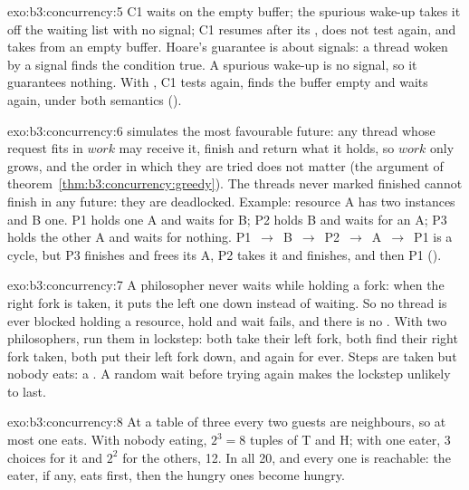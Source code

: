\begin{solution}{exo:b3:concurrency:5}
C1 waits on the empty buffer; the spurious wake-up takes it off the waiting list with no signal; C1 resumes after its , does not test again, and takes from an empty buffer. Hoare's guarantee is about signals: a thread woken by a signal finds the condition true. A spurious wake-up is no signal, so it guarantees nothing. With , C1 tests again, finds the buffer empty and waits again, under both semantics ().
\end{solution}

\begin{solution}{exo:b3:concurrency:6}
 simulates the most favourable future: any thread whose request fits in $\mathit{work}$ may receive it, finish and return what it holds, so $\mathit{work}$ only grows, and the order in which they are tried does not matter (the argument of theorem~\ref{thm:b3:concurrency:greedy}). The threads never marked finished cannot finish in any future: they are deadlocked. Example: resource A has two instances and B one. P1 holds one A and waits for B; P2 holds B and waits for an A; P3 holds the other A and waits for nothing. P1~$\to$~B~$\to$~P2~$\to$~A~$\to$~P1 is a cycle, but P3 finishes and frees its A, P2 takes it and finishes, and then P1 ().
\end{solution}

\begin{solution}{exo:b3:concurrency:7}
A philosopher never waits while holding a fork: when the right fork is taken, it puts the left one down instead of waiting. So no thread is ever blocked holding a resource, hold and wait fails, and there is no . With two philosophers, run them in lockstep: both take their left fork, both find their right fork taken, both put their left fork down, and again for ever. Steps are taken but nobody eats: a . A random wait before trying again makes the lockstep unlikely to last.
\end{solution}

\begin{solution}{exo:b3:concurrency:8}
At a table of three every two guests are neighbours, so at most one eats. With nobody eating, $2^3 = 8$ tuples of T and H; with one eater, 3 choices for it and $2^2$ for the others, 12. In all 20, and every one is reachable: the eater, if any, eats first, then the hungry ones become hungry.
\end{solution}

